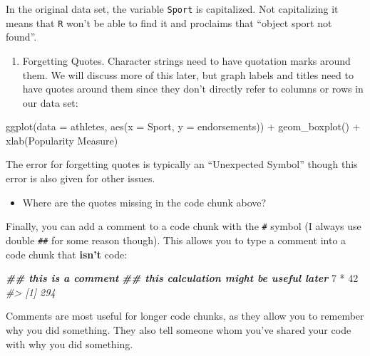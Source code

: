 \documentclass[
]{book}
\newenvironment{Shaded}{\begin{snugshade}}{\end{snugshade}}
\newcommand{\AttributeTok}[1]{\textcolor[rgb]{0.77,0.63,0.00}{#1}}
\newcommand{\CommentTok}[1]{\textcolor[rgb]{0.56,0.35,0.01}{\textit{#1}}}
\newcommand{\DecValTok}[1]{\textcolor[rgb]{0.00,0.00,0.81}{#1}}
\newcommand{\DocumentationTok}[1]{\textcolor[rgb]{0.56,0.35,0.01}{\textbf{\textit{#1}}}}
\newcommand{\FunctionTok}[1]{\textcolor[rgb]{0.00,0.00,0.00}{#1}}
\newcommand{\NormalTok}[1]{#1}
\newcommand{\SpecialCharTok}[1]{\textcolor[rgb]{0.00,0.00,0.00}{#1}}
\providecommand{\tightlist}{%
  \setlength{\itemsep}{0pt}\setlength{\parskip}{0pt}}
\begin{document}
In the original data set, the variable \texttt{Sport} is capitalized. Not capitalizing it means that \texttt{R} won't be able to find it and proclaims that ``object sport not found''.

\begin{enumerate}
\def\labelenumi{\arabic{enumi}.}
\setcounter{enumi}{3}
\tightlist
\item
  Forgetting Quotes. Character strings need to have quotation marks around them. We will discuss more of this later, but graph labels and titles need to have quotes around them since they don't directly refer to columns or rows in our data set:
\end{enumerate}

\begin{Shaded}
\begin{Highlighting}[]
\FunctionTok{ggplot}\NormalTok{(}\AttributeTok{data =}\NormalTok{ athletes, }\FunctionTok{aes}\NormalTok{(}\AttributeTok{x =}\NormalTok{ Sport, }\AttributeTok{y =}\NormalTok{ endorsements)) }\SpecialCharTok{+} 
  \FunctionTok{geom\_boxplot}\NormalTok{() }\SpecialCharTok{+} \FunctionTok{xlab}\NormalTok{(Popularity Measure)}
\end{Highlighting}
\end{Shaded}

The error for forgetting quotes is typically an ``Unexpected Symbol'' though this error is also given for other issues.

\begin{itemize}
\tightlist
\item
  Where are the quotes missing in the code chunk above?
\end{itemize}

Finally, you can add a comment to a code chunk with the \texttt{\#} symbol (I always use double \texttt{\#\#} for some reason though). This allows you to type a comment into a code chunk that \textbf{isn't} code:

\begin{Shaded}
\begin{Highlighting}[]
\DocumentationTok{\#\# this is a comment}
\DocumentationTok{\#\# this calculation might be useful later}
\DecValTok{7} \SpecialCharTok{*} \DecValTok{42}
\CommentTok{\#\textgreater{} [1] 294}
\end{Highlighting}
\end{Shaded}

Comments are most useful for longer code chunks, as they allow you to remember why you did something. They also tell someone whom you've shared your code with why you did something.
\end{document}
